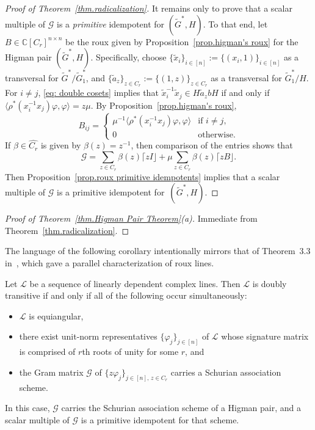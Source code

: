 \begin{proof}[Proof of Theorem~\ref{thm.radicalization}]
It remains only to prove that a scalar multiple of $\mathcal{G}$ is a \emph{primitive} idempotent for $(\widetilde{G}^*,H)$.
To that end, let $B \in \mathbb{C}[C_r]^{n\times n}$ be the roux given by Proposition~\ref{prop.higman's roux} for the Higman pair $(\widetilde{G}^*,H)$.
Specifically, choose $\{ \tilde{x}_i \}_{i\in [n]} := \{ (x_i,1) \}_{i \in [n]}$ as a transversal for $\widetilde{G}^*/\widetilde{G}_1^*$, and $\{ \tilde{a}_z \}_{z\in C_r} := \{ (1,z) \}_{z \in C_r}$ as a transversal for $\tilde{G}_1^* / H$.
For $i \neq j$, \eqref{eq: double cosets} implies that $\tilde{x}_i^{-1} \tilde{x}_j \in H \tilde{a}_z b H$ if and only if $\langle \rho^*(x_i^{-1} x_j) \varphi, \varphi \rangle = z \mu$.
By Proposition~\ref{prop.higman's roux},
\[ B_{ij} 
= \begin{cases}
 \mu^{-1} \langle  \rho^*(x_i^{-1} x_j) \varphi, \varphi \rangle & \text{if }i\neq j, \\
 0 & \text{otherwise}.
 \end{cases}
 \]
 If $\beta \in \hat{C_r}$ is given by $\beta(z) = z^{-1}$, then comparison of the entries shows that 
 \[ \mathcal{G} = \sum_{z \in C_r} \beta(z) \lceil z I \rfloor + \mu \sum_{z\in C_r} \beta(z) \lceil z B \rfloor. \]
 Then Proposition~\ref{prop.roux primitive idempotents} implies that a scalar multiple of $\mathcal{G}$ is a primitive idempotent for~$(\widetilde{G}^*,H)$.
 \end{proof}

\begin{proof}[Proof of Theorem~\ref{thm.Higman Pair Theorem}(a)]
Immediate from Theorem~\ref{thm.radicalization}.
\end{proof}

The language of the following corollary intentionally mirrors that of Theorem~3.3 in~\cite{IversonM:18}, which gave a parallel characterization of roux lines.

\begin{corollary}
Let $\mathscr{L}$ be a sequence of linearly dependent complex lines.
Then $\mathscr{L}$ is doubly transitive if and only if all of the following occur simultaneously:
\begin{itemize}
\item[(a)]
$\mathscr{L}$ is equiangular,
\item[(b)]
there exist unit-norm representatives $\{ \varphi_j \}_{j\in [n]}$ of $\mathscr{L}$ whose signature matrix is comprised of $r$th roots of unity for some $r$, and
\item[(c)]
the Gram matrix $\mathcal{G}$ of $\{ z \varphi_j \}_{j \in [n],\, z \in C_r}$ carries a Schurian association scheme.
\end{itemize}
In this case, $\mathcal{G}$ carries the Schurian association scheme of a Higman pair, and a scalar multiple of $\mathcal{G}$ is a primitive idempotent for that scheme.
\end{corollary}

